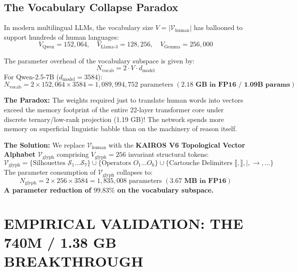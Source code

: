 \documentclass[10pt,twocolumn]{article}
\begin{document}
\subsection{The Vocabulary Collapse Paradox}

In modern multilingual LLMs, the vocabulary size $V = |\mathcal{V}_{\text{human}}|$ has ballooned to support hundreds of human languages:
\begin{equation}
  V_{\text{Qwen}} = 152{,}064, \quad V_{\text{Llama-3}} = 128{,}256, \quad V_{\text{Gemma}} = 256{,}000
\end{equation}

The parameter overhead of the vocabulary subspace is given by:
\begin{equation}
  N_{\text{vocab}} = 2 \cdot V \cdot d_{\text{model}}
\end{equation}
For Qwen-2.5-7B ($d_{\text{model}} = 3584$):
\begin{equation}
  N_{\text{vocab}} = 2 \times 152{,}064 \times 3584 = 1{,}089{,}994{,}752 \text{ parameters } (\mathbf{2.18 \text{ GB in FP16 / 1.09B params}})
\end{equation}

\textbf{The Paradox:}  
The weights required just to translate human words into vectors exceed the memory footprint of the entire 22-layer transformer core under discrete ternary/low-rank projection (1.19 GB)! The network spends more memory on superficial linguistic babble than on the machinery of reason itself.

\textbf{The Solution:}  
We replace $\mathcal{V}_{\text{human}}$ with the \textbf{KAIROS V6 Topological Vector Alphabet} $\mathcal{V}_{\text{glyph}}$ comprising $V_{\text{glyph}} = 256$ invariant structural tokens:
\begin{equation}
  \mathcal{V}_{\text{glyph}} = \{\text{Silhouettes } \mathcal{S}_1 \dots \mathcal{S}_7\} \cup \{\text{Operators } O_1 \dots O_6\} \cup \{\text{Cartouche Delimiters } \llbracket, \rrbracket, |, \to, \dots\}
\end{equation}
The parameter consumption of $\mathcal{V}_{\text{glyph}}$ collapses to:
\begin{equation}
  N_{\text{glyph}} = 2 \times 256 \times 3584 = 1{,}835{,}008 \text{ parameters } (\mathbf{3.67 \text{ MB in FP16}})
\end{equation}
\textbf{A parameter reduction of $99.83\%$ on the vocabulary subspace.}



\section{EMPIRICAL VALIDATION: THE 740M / 1.38 GB BREAKTHROUGH}
\end{document}
